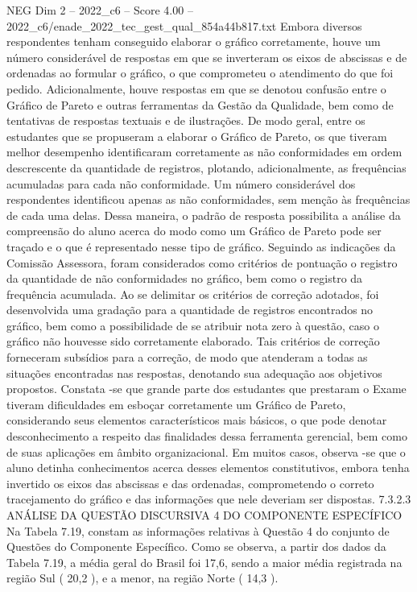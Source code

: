 \begin{textsample}{NEG Dim 2 – 2022\_c6 – Score 4.00 – 2022\_c6/enade\_2022\_tec\_gest\_qual\_854a44b817.txt}
Embora diversos respondentes tenham conseguido elaborar o gráfico corretamente, houve um número considerável de respostas em que se inverteram os eixos de abscissas e de ordenadas ao formular o gráfico, o que comprometeu o atendimento do que foi pedido.
Adicionalmente, houve respostas em que se denotou confusão entre o Gráfico de Pareto e outras ferramentas da Gestão da Qualidade, bem como de tentativas de respostas textuais e de ilustrações.
De modo geral, entre os estudantes que se propuseram a elaborar o Gráfico de Pareto, os que tiveram melhor desempenho identificaram corretamente as não conformidades em ordem descrescente da quantidade de registros, plotando, adicionalmente, as frequências acumuladas para cada não conformidade.
Um número considerável dos respondentes identificou apenas as não conformidades, sem menção às frequências de cada uma delas.
Dessa maneira, o padrão de resposta possibilita a análise da compreensão do aluno acerca do modo como um Gráfico de Pareto pode ser traçado e o que é representado nesse tipo de gráfico.
Seguindo as indicações da Comissão Assessora, foram considerados como critérios de pontuação o registro da quantidade de não conformidades no gráfico, bem como o registro da frequência acumulada.
Ao se delimitar os critérios de correção adotados, foi desenvolvida uma gradação para a quantidade de registros encontrados no gráfico, bem como a possibilidade de se atribuir nota zero à questão, caso o gráfico não houvesse sido corretamente elaborado.
Tais critérios de correção forneceram subsídios para a correção, de modo que atenderam a todas as situações encontradas nas respostas, denotando sua adequação aos objetivos propostos.
Constata -se que grande parte dos estudantes que prestaram o Exame tiveram dificuldades em esboçar corretamente um Gráfico de Pareto, considerando seus elementos característicos mais básicos, o que pode denotar desconhecimento a respeito das finalidades dessa ferramenta gerencial, bem como de suas aplicações em âmbito organizacional.
Em muitos casos, observa -se que o aluno detinha conhecimentos acerca desses elementos constitutivos, embora tenha invertido os eixos das abscissas e das ordenadas, comprometendo o correto tracejamento do gráfico e das informações que nele deveriam ser dispostas. 7.3.2.3 ANÁLISE DA QUESTÃO DISCURSIVA 4 DO COMPONENTE ESPECÍFICO Na Tabela 7.19, constam as informações relativas à Questão 4 do conjunto de Questões do Componente Específico.
Como se observa, a partir dos dados da Tabela 7.19, a média geral do Brasil foi 17,6, sendo a maior média registrada na região Sul ( 20,2 ), e a menor, na região Norte ( 14,3 ).

\end{textsample}
